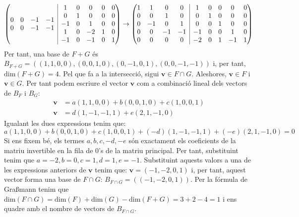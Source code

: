 \documentclass[11pt,a4paper]{article}
\newcommand{\rvline}{\hspace*{-\arraycolsep}\vline\hspace*{-\arraycolsep}}
\begin{document}
\begin{enumerate}
\begin{enumerate}
\begin{multline*}
\begin{pmatrix}
\begin{matrix}
            0 & 0 & -1 & -1 \\
            0 & 0 & -1 & -1 \\
            \end{matrix} & \rvline & \begin{matrix}
            1 & 0 & 0 & 0 & 0  \\
            0 & 1 & 0 & 0 & 0  \\
            -1 & 0 & 1 & 0 & 0  \\
            1 & 0 & -2 & 1 & 0  \\
            -1 & 0 & -1 & 0 & 1 \\
            \end{matrix}
            \end{pmatrix}\rightarrow\begin{pmatrix}
            \begin{matrix}
            1 & 1 & 0 & 0 \\
            0 & 0 & 1 & 0 \\
            0 & -1 & 0 & 1 \\
            0 & 0 & -1 & -1 \\
            0 & 0 & 0 & 0 \\
            \end{matrix} & \rvline & \begin{matrix}
            1 & 0 & 0 & 0 & 0  \\
            0 & 1 & 0 & 0 & 0  \\
            0 & 0 & 1 & 0 & 0  \\
            -1 & 0 & 0 & 1 & 0  \\
            -2 & 0 & 1 & -1 & 1 \\
            \end{matrix}
            \end{pmatrix}
        \end{multline*}
        Per tant, una base de $F+G$ és $B_{F+G}=((1,1,0,0),(0,0,1,0),(0,-1,0,1),(0,0,-1,-1))$ i, per tant, $\text{dim} (F+G)=4$. Pel que fa a la intersecció, sigui $\textbf{v}\in F\cap G$. Aleshores, $\textbf{v}\in F$ i $\textbf{v}\in G$. Per tant podem escriure el vector $\textbf{v}$ com a combinació lineal dels vectors de $B_{F}$ i $B_{G}$:
        \begin{align*}
            \textbf{v}&=a(1,1,0,0)+b(0,0,1,0)+c(1,0,0,1)\\
            \textbf{v}&=d(1,-1,-1,1)+e(2,1,-1,0)
        \end{align*} Igualant les dues expressions tenim que: $$a(1,1,0,0)+b(0,0,1,0)+c(1,0,0,1)+(-d)(1,-1,-1,1)+(-e)(2,1,-1,0)=0$$ Si ens fixem bé, els termes $a,b,c,-d,-e$ són exactament els coeficients de la matriu invertible en la fila de $0$'s de la matriu principal. Per tant, substituint tenim que $a=-2,b=0,c=1,d=1,e=-1$. Substituint aquests valors a una de les expressions anteriors de $\textbf{v}$ tenim que: $\textbf{v}=(-1,-2,0,1)$ i, per tant, aquest vector forma una base de $F\cap G$: $B_{F\cap G}=((-1,-2,0,1))$. Per la fórmula de Gra\ss mann tenim que $\text{dim}(F\cap G)=\text{dim}(F)+\text{dim}(G)-\text{dim}(F+G)=3+2-4=1$ i ens quadre amb el nombre de vectors de $B_{F\cap G}$.

\end{enumerate}
\end{enumerate}
\end{document}
